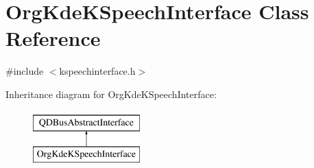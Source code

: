\hypertarget{classOrgKdeKSpeechInterface}{\section{Org\+Kde\+K\+Speech\+Interface Class Reference}
\label{classOrgKdeKSpeechInterface}
}


{\ttfamily \#include $<$kspeechinterface.\+h$>$}

Inheritance diagram for Org\+Kde\+K\+Speech\+Interface\+:\begin{figure}[H]
\begin{center}
\leavevmode
\includegraphics[height=2.000000cm]{classOrgKdeKSpeechInterface}
\end{center}
\end{figure}
